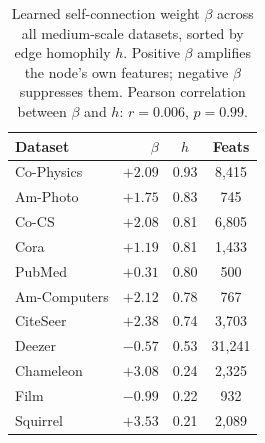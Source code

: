 \begin{table}[t]
\centering
\small
\begin{tabular}{l|rcc}
\toprule
\textbf{Dataset} & $\beta$ & $h$ & \textbf{Feats} \\
\midrule
Co-Physics   & $+2.09$ & 0.93 & 8,415 \\
Am-Photo     & $+1.75$ & 0.83 & 745 \\
Co-CS        & $+2.08$ & 0.81 & 6,805 \\
Cora         & $+1.19$ & 0.81 & 1,433 \\
PubMed       & $+0.31$ & 0.80 & 500 \\
Am-Computers & $+2.12$ & 0.78 & 767 \\
CiteSeer     & $+2.38$ & 0.74 & 3,703 \\
\midrule
Deezer       & $-0.57$ & 0.53 & 31,241 \\
Chameleon    & $+3.08$ & 0.24 & 2,325 \\
Film         & $-0.99$ & 0.22 & 932 \\
Squirrel     & $+3.53$ & 0.21 & 2,089 \\
\bottomrule
\end{tabular}
\caption{Learned self-connection weight $\beta$ across all medium-scale datasets, sorted by edge homophily $h$.  Positive $\beta$ amplifies the node's own features; negative $\beta$ suppresses them.  Pearson correlation between $\beta$ and $h$: $r = 0.006$, $p = 0.99$.}
\label{tab:beta_values}
\end{table}
